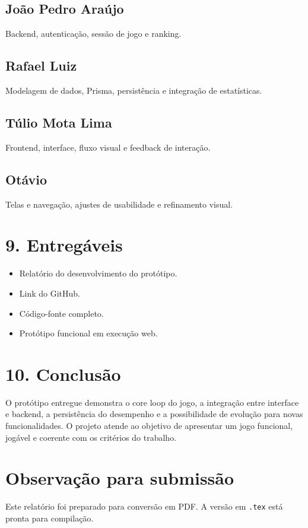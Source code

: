 \documentclass[12pt,a4paper]{article}
\begin{document}
\subsection*{João Pedro Araújo}
Backend, autenticação, sessão de jogo e ranking.

\subsection*{Rafael Luiz}
Modelagem de dados, Prisma, persistência e integração de estatísticas.

\subsection*{Túlio Mota Lima}
Frontend, interface, fluxo visual e feedback de interação.

\subsection*{Otávio}
Telas e navegação, ajustes de usabilidade e refinamento visual.

\section*{9. Entregáveis}
\begin{itemize}[leftmargin=1.2em]
  \item Relatório do desenvolvimento do protótipo.
  \item Link do GitHub.
  \item Código-fonte completo.
  \item Protótipo funcional em execução web.
\end{itemize}

\section*{10. Conclusão}
O protótipo entregue demonstra o core loop do jogo, a integração entre interface e backend, a persistência do desempenho e a possibilidade de evolução para novas funcionalidades. O projeto atende ao objetivo de apresentar um jogo funcional, jogável e coerente com os critérios do trabalho.

\section*{Observação para submissão}
Este relatório foi preparado para conversão em PDF. A versão em \texttt{.tex} está pronta para compilação.
\end{document}
